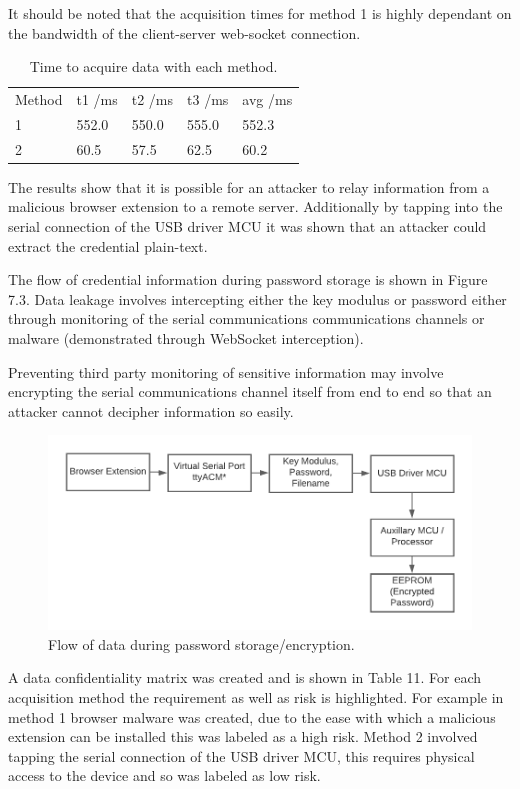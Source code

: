 It should be noted that the acquisition times for method 1 is highly dependant on the bandwidth of the client-server web-socket connection.

\begin{table}[H]
\centering
\begin{tabular}{lllll}
Method & t1 /ms & t2 /ms & t3 /ms & avg /ms \\
1      & 552.0   & 550.0  & 555.0  & 552.3    \\
2      & 60.5    & 57.5   & 62.5   & 60.2     
\end{tabular}
\caption{Time to acquire data with each method.}
\end{table}

The results show that it is possible for an attacker to relay information from a malicious browser extension to a remote server. Additionally by tapping into the serial connection of the USB driver MCU it was shown that an attacker could extract the credential plain-text.

The flow of credential information during password storage is shown in Figure 7.3. Data leakage involves intercepting either the key modulus or password either through monitoring of the serial communications communications channels or malware (demonstrated through WebSocket interception).

Preventing third party monitoring of sensitive information may involve encrypting the serial communications channel itself from end to end so that an attacker cannot decipher information so easily. 
\begin{figure}[H]
\centering
\includegraphics[width=0.8\columnwidth]{Figures/Fig_30.png}
\caption{Flow of data during password storage/encryption.}
\label{fig:gantt}
\end{figure}

A data confidentiality matrix was created and is shown in Table 11. For each acquisition method the requirement as well as risk is highlighted. For example in method 1 browser malware was created, due to the ease with which a malicious extension can be installed this was labeled as a high risk. Method 2 involved tapping the serial connection of the USB driver MCU, this requires physical access to the device and so was labeled as low risk.

